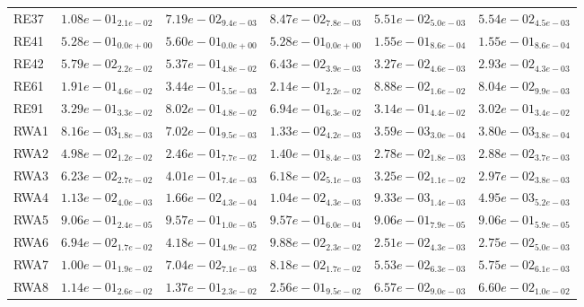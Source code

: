 \documentclass{article}
\begin{document}
\begin{table}
\begin{scriptsize}
\begin{tabular}{llllll}
RE37 & $  1.08e-01_{ 2.1e-02}$ & $  7.19e-02_{ 9.4e-03}$ & $  8.47e-02_{ 7.8e-03}$ & \cellcolor{gray95}$  5.51e-02_{ 5.0e-03}$ & \cellcolor{gray25}$  5.54e-02_{ 4.5e-03}$ \\
RE41 & $  5.28e-01_{ 0.0e+00}$ & $  5.60e-01_{ 0.0e+00}$ & $  5.28e-01_{ 0.0e+00}$ & \cellcolor{gray95}$  1.55e-01_{ 8.6e-04}$ & \cellcolor{gray25}$  1.55e-01_{ 8.6e-04}$ \\
RE42 & $  5.79e-02_{ 2.2e-02}$ & $  5.37e-01_{ 4.8e-02}$ & $  6.43e-02_{ 3.9e-03}$ & \cellcolor{gray25}$  3.27e-02_{ 4.6e-03}$ & \cellcolor{gray95}$  2.93e-02_{ 4.3e-03}$ \\
RE61 & $  1.91e-01_{ 4.6e-02}$ & $  3.44e-01_{ 5.5e-03}$ & $  2.14e-01_{ 2.2e-02}$ & \cellcolor{gray25}$  8.88e-02_{ 1.6e-02}$ & \cellcolor{gray95}$  8.04e-02_{ 9.9e-03}$ \\
RE91 & $  3.29e-01_{ 3.3e-02}$ & $  8.02e-01_{ 4.8e-02}$ & $  6.94e-01_{ 6.3e-02}$ & \cellcolor{gray25}$  3.14e-01_{ 4.4e-02}$ & \cellcolor{gray95}$  3.02e-01_{ 3.4e-02}$ \\
RWA1 & $  8.16e-03_{ 1.8e-03}$ & $  7.02e-01_{ 9.5e-03}$ & $  1.33e-02_{ 4.2e-03}$ & \cellcolor{gray95}$  3.59e-03_{ 3.0e-04}$ & \cellcolor{gray25}$  3.80e-03_{ 3.8e-04}$ \\
RWA2 & $  4.98e-02_{ 1.2e-02}$ & $  2.46e-01_{ 7.7e-02}$ & $  1.40e-01_{ 8.4e-03}$ & \cellcolor{gray95}$  2.78e-02_{ 1.8e-03}$ & \cellcolor{gray25}$  2.88e-02_{ 3.7e-03}$ \\
RWA3 & $  6.23e-02_{ 2.7e-02}$ & $  4.01e-01_{ 7.4e-03}$ & $  6.18e-02_{ 5.1e-03}$ & \cellcolor{gray25}$  3.25e-02_{ 1.1e-02}$ & \cellcolor{gray95}$  2.97e-02_{ 3.8e-03}$ \\
RWA4 & $  1.13e-02_{ 4.0e-03}$ & $  1.66e-02_{ 4.3e-04}$ & $  1.04e-02_{ 4.3e-03}$ & \cellcolor{gray25}$  9.33e-03_{ 1.4e-03}$ & \cellcolor{gray95}$  4.95e-03_{ 5.2e-03}$ \\
RWA5 & $  9.06e-01_{ 2.4e-05}$ & $  9.57e-01_{ 1.0e-05}$ & $  9.57e-01_{ 6.0e-04}$ & \cellcolor{gray25}$  9.06e-01_{ 7.9e-05}$ & \cellcolor{gray95}$  9.06e-01_{ 5.9e-05}$ \\
RWA6 & $  6.94e-02_{ 1.7e-02}$ & $  4.18e-01_{ 4.9e-02}$ & $  9.88e-02_{ 2.3e-02}$ & \cellcolor{gray95}$  2.51e-02_{ 4.3e-03}$ & \cellcolor{gray25}$  2.75e-02_{ 5.0e-03}$ \\
RWA7 & $  1.00e-01_{ 1.9e-02}$ & $  7.04e-02_{ 7.1e-03}$ & $  8.18e-02_{ 1.7e-02}$ & \cellcolor{gray95}$  5.53e-02_{ 6.3e-03}$ & \cellcolor{gray25}$  5.75e-02_{ 6.1e-03}$ \\
RWA8 & $  1.14e-01_{ 2.6e-02}$ & $  1.37e-01_{ 2.3e-02}$ & $  2.56e-01_{ 9.5e-02}$ & \cellcolor{gray95}$  6.57e-02_{ 9.0e-03}$ & \cellcolor{gray25}$  6.60e-02_{ 1.0e-02}$ \\

\end{tabular}
\end{scriptsize}
\end{table}
\end{document}
